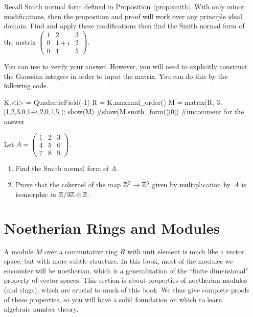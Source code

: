 \begin{exercise}
	Recall Smith normal form defined in Proposition~\ref{prop:smith}. With only minor modifications, then the proposition and proof will work over any principle ideal domain. Find and apply these modifications then find the Smith normal form of the matrix $\begin{pmatrix} 1 & 2 & 3 \\ 0 & 1+i & 2 \\ 0 & 1 & 5 \end{pmatrix}$.
	
	\begin{hint}
		You can use \sage{} to verify your answer. However, you will need to explicitly construct the Gaussian integers in order to input the matrix. You can do this by the following code.
	\end{hint}
	\begin{sagecode}
	\begin{sagecell}
K.<i> = QuadraticField(-1)
R = K.maximal_order()
M = matrix(R, 3, [1,2,3,0,1+i,2,0,1,5]); show(M)
#show(M.smith_form()[0]) #uncomment for the answer
	\end{sagecell}
	\end{sagecode}
\end{exercise}

\begin{exercise}
	Let $A=\left(
	        \begin{matrix}1&2&3\\4&5&6\\7&8&9
	        \end{matrix}\right)$.
	\begin{enumerate}
	\item Find the Smith normal form of $A$.
	\item Prove that
	the cokernel of the map $\mathbb{Z}^3\to \mathbb{Z}^3$ given by multiplication by~$A$
	is isomorphic to $\mathbb{Z}/3\mathbb{Z} \oplus \mathbb{Z}$.
	\end{enumerate}
\end{exercise}

\section{Noetherian Rings and Modules}\label{sec:noetherian}

A module $M$ over a commutative ring $R$ with unit element is much
like a vector space, but with more subtle structure.  In this book,
most of the modules we encounter will be noetherian, which is a
generalization of the ``finite dimensional'' property of vector
spaces.  This section is about properties of noetherian modules (and
rings), which are crucial to much of this book.  We thus
give complete proofs of these properties, so you will have a solid
foundation on which to learn algebraic number theory.

